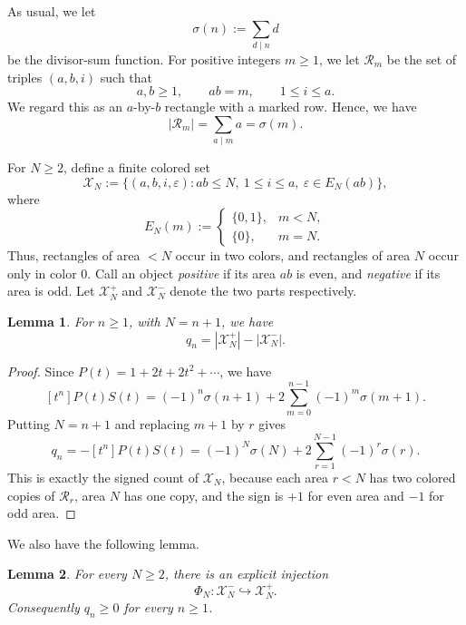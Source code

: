 \documentclass[11pt]{article}
\newtheorem{lemma}{Lemma}
\newcommand{\calR}{\mathcal{R}}
\newcommand{\calX}{\mathcal{X}}
\begin{document}
As usual, we let
\[
  \sigma(n):=\sum_{d\mid n}d
\]
be the divisor-sum function.
For positive integers $m\geq1$, we let  $\calR_m$ be the set of triples $(a,b,i)$ such that
\[
  a,b\geq1,
  \qquad ab=m,
  \qquad 1\leq i\leq a.
\]
We regard this as an $a$-by-$b$ rectangle with a marked row.  Hence, we have
\[
  |\calR_m|=\sum_{a\mid m}a=\sigma(m).
\]

For $N\geq2$, define a finite colored set
\[
  \calX_N:=
  \{(a,b,i,\varepsilon):ab\leq N,
       \ 1\leq i\leq a,
       \ \varepsilon\in E_N(ab)\},
\]
where
\[
  E_N(m):=
  \begin{cases}
    \{0,1\},&m<N,\\
    \{0\},&m=N.
  \end{cases}
\]
Thus, rectangles of area $<N$ occur in two colors, and rectangles of area $N$ occur only in color $0$.  Call an object {\it positive} if its area $ab$ is even, and {\it negative} if its area is odd.  Let $\calX_N^+$ and $\calX_N^-$ denote the two parts respectively.  
\begin{lemma}\label{lem:q-signed-count}
For $n\geq1$, with $N=n+1$, we have
\[
  q_n=|\calX_N^+|-|\calX_N^-|.
\]
\end{lemma}

\begin{proof}
Since $P(t)=1+2t+2t^2+\cdots$, we have
\[
  [t^n]P(t)S(t)
  =(-1)^n\sigma(n+1)+2\sum_{m=0}^{n-1}(-1)^m\sigma(m+1).
\]
Putting $N=n+1$ and replacing $m+1$ by $r$ gives
\[
  q_n=-[t^n]P(t)S(t)
      =(-1)^N\sigma(N)+2\sum_{r=1}^{N-1}(-1)^r\sigma(r).
\]
This is exactly the signed count of $\calX_N$, because each area $r<N$ has two colored copies of $\calR_r$, area $N$ has one copy, and the sign is $+1$ for even area and $-1$ for odd area.
\end{proof}

We also have the following lemma.

\begin{lemma}\label{lem:injection}
For every $N\geq2$, there is an explicit injection
\[
  \Phi_N:\calX_N^-\hookrightarrow\calX_N^+.
\]
Consequently $q_n\geq0$ for every $n\geq1$.
\end{lemma}
\end{document}
